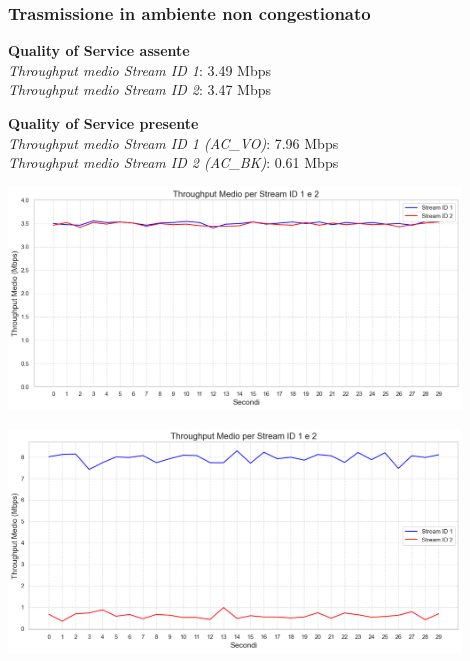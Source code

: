 \documentclass[aspectratio=169]{beamer}
\begin{document}
\begin{frame}
    \frametitle{Trasmissione in ambiente non congestionato}
    \centering
    \hspace{0.05\textwidth} %
    \begin{minipage}{0.9\textwidth}
        \begin{minipage}{0.45\textwidth}
            \textbf{Quality of Service assente}\\
            \textit{Throughput medio Stream ID 1}: 3.49 Mbps\\
            \textit{Throughput medio Stream ID 2}: 3.47 Mbps\\
            \vspace{1cm}
            
            \textbf{Quality of Service presente}\\
            \textit{Throughput medio Stream ID 1 (AC\_VO)}: 7.96 Mbps\\
            \textit{Throughput medio Stream ID 2 (AC\_BK)}: 0.61 Mbps\\
        \end{minipage}
        \hfill
        \begin{minipage}{0.5\textwidth}
            \centering
            \begin{minipage}{\textwidth}
                \includegraphics[width=0.9\textwidth]{t1_c0_main.png}
                \vspace{0.5cm}
            \end{minipage}
            \begin{minipage}{\textwidth}
                \includegraphics[width=0.9\textwidth]{t2_c0_main.png}
            \end{minipage}
        \end{minipage}
    \end{minipage}
\end{frame}
\end{document}
